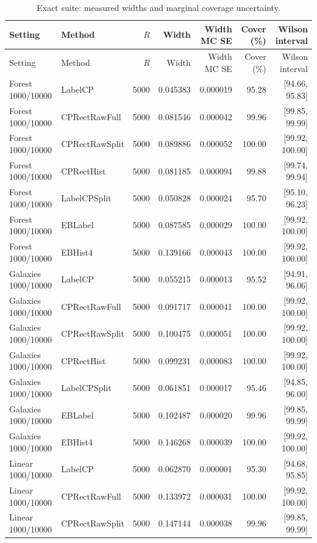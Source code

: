 \begin{longtable}{llrrrrr}
\caption{Exact suite: measured widths and marginal coverage uncertainty.}\label{tab:fullexact}\\
\toprule Setting & Method & $R$ & Width & Width MC SE & Cover (\%) & Wilson interval\\\midrule\endfirsthead
\toprule Setting & Method & $R$ & Width & Width MC SE & Cover (\%) & Wilson interval\\\midrule\endhead
Forest 1000/10000 & LabelCP & 5000 & 0.045383 & 0.000019 & 95.28 & [94.66, 95.83]\\
Forest 1000/10000 & CPRectRawFull & 5000 & 0.081546 & 0.000042 & 99.96 & [99.85, 99.99]\\
Forest 1000/10000 & CPRectRawSplit & 5000 & 0.089886 & 0.000052 & 100.00 & [99.92, 100.00]\\
Forest 1000/10000 & CPRectHist & 5000 & 0.081185 & 0.000094 & 99.88 & [99.74, 99.94]\\
Forest 1000/10000 & LabelCPSplit & 5000 & 0.050828 & 0.000024 & 95.70 & [95.10, 96.23]\\
Forest 1000/10000 & EBLabel & 5000 & 0.087585 & 0.000029 & 100.00 & [99.92, 100.00]\\
Forest 1000/10000 & EBHist4 & 5000 & 0.139166 & 0.000043 & 100.00 & [99.92, 100.00]\\
Galaxies 1000/10000 & LabelCP & 5000 & 0.055215 & 0.000013 & 95.52 & [94.91, 96.06]\\
Galaxies 1000/10000 & CPRectRawFull & 5000 & 0.091717 & 0.000041 & 100.00 & [99.92, 100.00]\\
Galaxies 1000/10000 & CPRectRawSplit & 5000 & 0.100475 & 0.000051 & 100.00 & [99.92, 100.00]\\
Galaxies 1000/10000 & CPRectHist & 5000 & 0.099231 & 0.000083 & 100.00 & [99.92, 100.00]\\
Galaxies 1000/10000 & LabelCPSplit & 5000 & 0.061851 & 0.000017 & 95.46 & [94.85, 96.00]\\
Galaxies 1000/10000 & EBLabel & 5000 & 0.102487 & 0.000020 & 99.96 & [99.85, 99.99]\\
Galaxies 1000/10000 & EBHist4 & 5000 & 0.146268 & 0.000039 & 100.00 & [99.92, 100.00]\\
Linear 1000/10000 & LabelCP & 5000 & 0.062870 & 0.000001 & 95.30 & [94.68, 95.85]\\
Linear 1000/10000 & CPRectRawFull & 5000 & 0.133972 & 0.000031 & 100.00 & [99.92, 100.00]\\
Linear 1000/10000 & CPRectRawSplit & 5000 & 0.147144 & 0.000038 & 99.96 & [99.85, 99.99]\\

\end{longtable}
